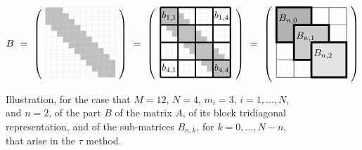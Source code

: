 \documentclass[preprint,1p,11pt]{elsarticle}
\numberwithin{equation}{section}   %
\numberwithin{figure}{section}  %
\begin{document}
\begin{figure}[t]
\begin{center}
\[
B\ =\
\begin{pmatrix}~
\begin{tikzpicture}[scale=0.42]
\foreach \k in {0,0.5,...,4.5}
  \fill[gray!50] (\k,6-\k) rectangle ++(1.5,-1.5);
\draw[gray!30,very thin,step=0.5cm] (0,0) grid (6,6);
\end{tikzpicture}
~\end{pmatrix}
\ =\
\begin{pmatrix}~
\begin{tikzpicture}[scale=0.42]
\foreach \k in {0,0.5,...,4.5}
  \fill[gray!50] (\k,6-\k) rectangle ++(1.5,-1.5);
\draw[gray!30,very thin,step=0.5cm] (0,0) grid (6,6);
\draw[black,line width=0.5mm,step=1.5cm] (0,0) grid (6,6);
\foreach \i in {1,4}
  {
  \foreach \j in {1,4}
     \node at ({1.5*\j-0.75},{6.75-1.5*\i}) {$b_{{\i},{\j}}$};
  }
\end{tikzpicture}
~\end{pmatrix}
\ =\
\begin{pmatrix}~
\begin{tikzpicture}[scale=0.42]
\draw[gray!10,very thin,step=0.5cm] (0,0) grid (6,6);
\draw[gray,line width=0.3mm,step=1.5cm] (0,0) grid (6,6);
\foreach \k [evaluate=\k as \l using int(80-20*\k)] in {1,2,3}
  {
    \fill[gray!\l] ({1.5*(\k-1)},{7.5-1.5*\k}) rectangle ++(3,-3);
    \draw[black,line width=0.7mm] ({1.5*(\k-1)},{7.5-1.5*\k}) rectangle ++(3,-3);
    \pgfmathtruncatemacro{\sub}{\k-1}
    \node at ({1.5*\k-0.5},{6.5-1.5*\k}) {$B_{n,{\sub}}$};
  }
\end{tikzpicture}
~\end{pmatrix}
\]
\end{center}
\caption{Illustration, for the case that $M=12$, $N=4$, $m_i=3$, $i=1,\ldots,N$, and $n=2$, of the part $B$ of the matrix $A$, of its block tridiagonal representation, and of the sub-matrices $B_{n,k}$, for $k=0,\ldots,N-n$, that arise in the $\tau$ method.} \label{fig:matrices}
\end{figure}
\end{document}
